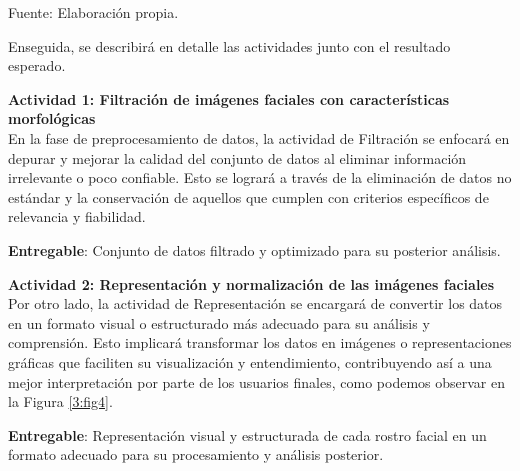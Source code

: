 \begin{longtable}{>{\raggedright\arraybackslash}p{4cm} >{\raggedright\arraybackslash}p{4cm} >{\raggedright\arraybackslash}p{5cm}}
\end{longtable}

\begin{flushleft}
	\small Fuente: Elaboración propia.
\end{flushleft}

Enseguida, se describirá en detalle las actividades junto con el resultado esperado.

\textbf{Actividad 1: Filtración de imágenes faciales con características morfológicas}
\\
En la fase de preprocesamiento de datos, la actividad de Filtración se enfocará en depurar y mejorar la calidad del conjunto de datos al eliminar información irrelevante o poco confiable. Esto se logrará a través de la eliminación de datos no estándar y la conservación de aquellos que cumplen con criterios específicos de relevancia y fiabilidad. 

\textbf{Entregable}: Conjunto de datos filtrado y optimizado para su posterior análisis.

\textbf{Actividad 2: Representación y normalización de las imágenes faciales}
\\
Por otro lado, la actividad de Representación se encargará de convertir los datos en un formato visual o estructurado más adecuado para su análisis y comprensión. Esto implicará transformar los datos en imágenes o representaciones gráficas que faciliten su visualización y entendimiento, contribuyendo así a una mejor interpretación por parte de los usuarios finales, como podemos observar en la Figura \ref{3:fig4}.

\textbf{Entregable}: Representación visual y estructurada de cada rostro facial en un formato adecuado para su procesamiento y análisis posterior.

